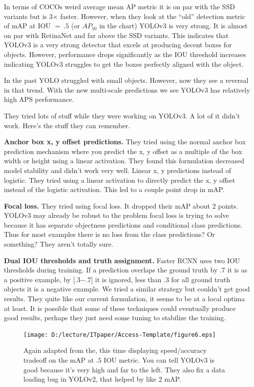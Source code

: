 \documentclass{ieeeaccess}
\begin{document}
In terms of COCOs weird average mean AP metric it is on par with the SSD variants but is 3× faster. However, when they look at the “old” detection metric of
mAP at IOU $= \ .5$ (or $AP_50$ in the chart) YOLOv3 is very strong. It is almost on par with RetinaNet and far above the SSD variants. This indicates that YOLOv3 is a very strong detector that excels at producing decent boxes for objects. However, performance drops significantly as the IOU threshold increases indicating YOLOv3 struggles to get the boxes perfectly aligned with the object.

In the past YOLO struggled with small objects. However, now they see a reversal in that trend. With the new multi-scale predictions we see YOLOv3 has relatively high
APS performance.

They tried lots of stuff while they were working on YOLOv3. A lot of it didn’t work. Here’s the stuff they can remember.

\textbf{Anchor box x, y offset predictions.} They tried using the normal anchor box prediction mechanism where you predict the x, y offset as a multiple of the box width or height using a linear activation. They found this formulation decreased model stability and didn’t work very well. Linear x, y predictions instead of logistic. They tried using a linear activation to directly predict the x, y offset instead of the logistic activation. This led to a couple point drop in mAP. 

\textbf{Focal loss.} They tried using focal loss. It dropped their mAP about 2 points. YOLOv3 may already be robust to the problem focal loss is trying to solve because it has separate objectness predictions and conditional class predictions. Thus for most examples there is no loss from the class predictions? Or something? They aren’t totally sure.

\textbf{Dual IOU thresholds and truth assignment.} Faster RCNN uses two IOU thresholds during training. If a prediction overlaps the ground truth by .7 it is as a positive example, by [.3−.7] it is ignored, less than $.3$ for all ground truth objects it is a negative example. We tried a similar strategy but couldn’t get good results. They quite like our current formulation, it seems to be at a local optima at least. It is possible that some of these techniques could eventually produce good results, perhaps they just need some tuning to stabilize the training.

\begin{figure}
	\centering
		\texttt{[image: D:/lecture/ITpaper/Access-Template/figure6.eps]}
	\caption {Again adapted from the, this time displaying speed/accuracy tradeoff on the mAP at $.5$ IOU metric. You can tell YOLOv3 is good because it’s very high and far to the left. They also fix a data loading bug in YOLOv2, that helped by like 2 mAP.}
	\label{fig:figure6}
\end{figure}
\end{document}
